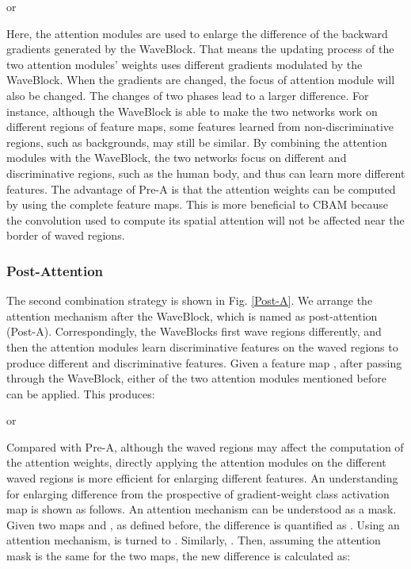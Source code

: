 \documentclass[journal]{IEEEtran}
\begin{document}
or

Here, the attention modules are used to enlarge the difference of the backward gradients generated by the WaveBlock. That means the updating process of the two attention modules’ weights uses different gradients modulated by the WaveBlock. When the gradients are changed, the focus of attention module will also be changed. The changes of two phases lead to a larger difference. For instance, although the WaveBlock is able to make the two networks work on different regions of feature maps, some features learned from non-discriminative regions, such as backgrounds, may still be similar. By combining the attention modules with the WaveBlock, the two networks focus on different and discriminative regions, such as the human body, and thus can learn more different features. 
The advantage of Pre-A is that the attention weights can be computed by using the complete feature maps. This is more beneficial to CBAM because the convolution used to compute its spatial attention will not be affected near the border of waved regions. 

\subsubsection{Post-Attention}
The second combination strategy is shown in Fig. \ref{Post-A}. We arrange the attention mechanism after the WaveBlock, which is named as post-attention (Post-A). Correspondingly, the WaveBlocks first wave regions differently, and then the attention modules learn discriminative features on the waved regions to produce different and discriminative features. Given a feature map , after passing through the WaveBlock, either of the two attention modules mentioned before can be applied. This produces:


or


 
Compared with Pre-A, although the waved regions may affect the computation of the attention weights, directly applying the attention modules on the different waved regions is more efficient for enlarging different features.  An understanding for enlarging difference from the prospective of gradient-weight class activation map is shown as follows. An attention mechanism can be understood as a  mask. Given two maps  and , as defined before, the difference is quantified as  .  Using an attention mechanism,  is turned to . Similarly, . Then, assuming the attention mask is the same for the two maps, the new difference is calculated as: 
\end{document}
